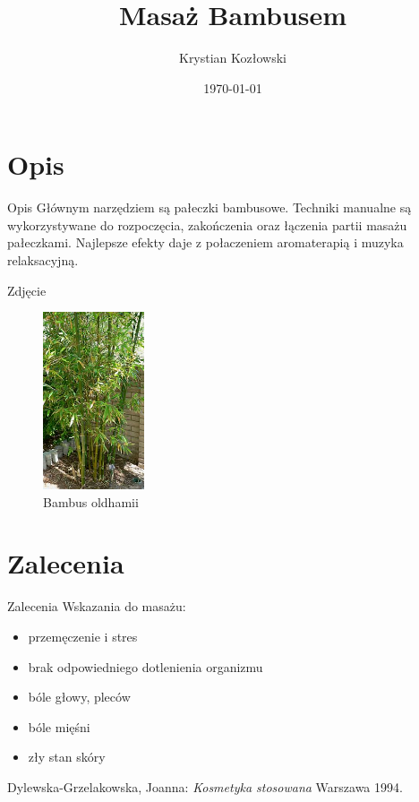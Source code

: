 \documentclass{beamer}
\title{Masaż Bambusem}
\author{Krystian Kozłowski}
\date{\today}
\begin{document}
\frame{\titlepage}
	
	






\section{Opis}
\begin{frame}{Opis}
Głównym narzędziem są pałeczki bambusowe. Techniki manualne są wykorzystywane do rozpoczęcia, zakończenia oraz łączenia partii masażu pałeczkami. Najlepsze efekty daje z połaczeniem aromaterapią i muzyka relaksacyjną.
\end{frame}
\begin{frame}{Zdjęcie}
\begin{figure}
\centering
\includegraphics[width=3cm,]{pic/bambus.jpg}
\caption{Bambus oldhamii}

\end{figure}

\end{frame}
\section{Zalecenia}
\begin {frame}{Zalecenia}
Wskazania do masażu:
\begin{itemize}
\item przemęczenie i stres
\pause
\item brak odpowiedniego dotlenienia organizmu
\pause
\item bóle głowy, pleców
\pause
\item bóle mięśni
\pause
\item zły stan skóry
\end{itemize}

\end{frame}
\begin{thebibliography}{99}
 Dylewska-Grzelakowska, Joanna: \textit{Kosmetyka stosowana}
Warszawa 1994.
\end{thebibliography}
\end{document}
